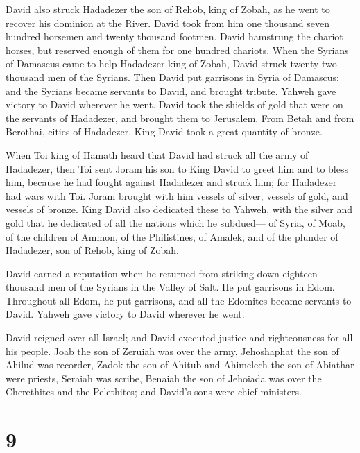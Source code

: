  David also struck Hadadezer the son of Rehob, king of
Zobah, as he went to recover his dominion at the River. 
David took from him one thousand seven hundred horsemen and twenty
thousand footmen. David hamstrung the chariot horses, but reserved
enough of them for one hundred chariots.  When the Syrians
of Damascus came to help Hadadezer king of Zobah, David struck twenty
two thousand men of the Syrians.  Then David put garrisons
in Syria of Damascus; and the Syrians became servants to David, and
brought tribute. Yahweh gave victory to David wherever he went.
 David took the shields of gold that were on the servants
of Hadadezer, and brought them to Jerusalem.  From Betah
and from Berothai, cities of Hadadezer, King David took a great quantity
of bronze.

 When Toi king of Hamath heard that David had struck all
the army of Hadadezer,  then Toi sent Joram his son to
King David to greet him and to bless him, because he had fought against
Hadadezer and struck him; for Hadadezer had wars with Toi. Joram brought
with him vessels of silver, vessels of gold, and vessels of bronze.
 King David also dedicated these to Yahweh, with the
silver and gold that he dedicated of all the nations which he subdued---
 of Syria, of Moab, of the children of Ammon, of the
Philistines, of Amalek, and of the plunder of Hadadezer, son of Rehob,
king of Zobah.

 David earned a reputation when he returned from striking
down eighteen thousand men of the Syrians in the Valley of Salt.
 He put garrisons in Edom. Throughout all Edom, he put
garrisons, and all the Edomites became servants to David. Yahweh gave
victory to David wherever he went.

 David reigned over all Israel; and David executed
justice and righteousness for all his people.  Joab the
son of Zeruiah was over the army, Jehoshaphat the son of Ahilud was
recorder,  Zadok the son of Ahitub and Ahimelech the son
of Abiathar were priests, Seraiah was scribe,  Benaiah
the son of Jehoiada was over the Cherethites and the Pelethites; and
David's sons were chief ministers.

\hypertarget{section-8}{%
\section{9}\label{section-8}}

